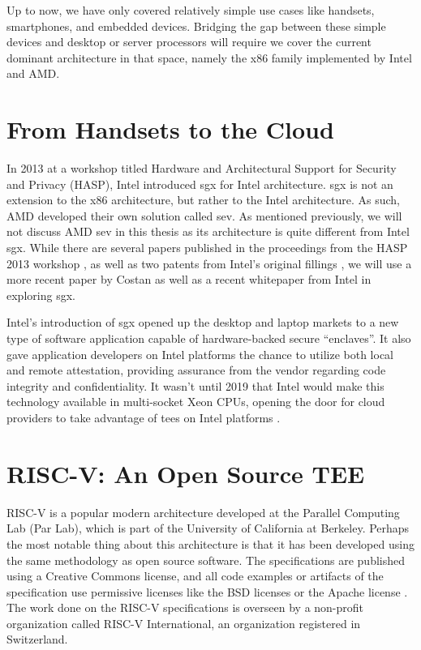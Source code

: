 Up to now, we have only covered relatively simple use cases like handsets, smartphones, and embedded devices. Bridging the gap between these simple devices and desktop or server processors will require we cover the current dominant architecture in that space, namely the x86 family implemented by Intel and AMD.

\section{From Handsets to the Cloud}
In 2013 at a workshop titled Hardware and Architectural Support for Security and Privacy (HASP), Intel introduced \gls{sgx} for Intel architecture. \gls{sgx} is not an extension to the x86 architecture, but rather to the Intel architecture. As such, AMD developed their own solution called \gls{sev}. As mentioned previously, we will not discuss AMD \gls{sev} in this thesis as its architecture is quite different from Intel \gls{sgx}. While there are several papers published in the proceedings from the HASP 2013 workshop \cite{10.1145/2487726.2488368, 10.1145/2487726.2488370, anati2013innovative}, as well as two patents from Intel's original fillings \cite{johnson2010technique, mckeen2009method}, we will use a more recent paper by Costan \cite{Costan2016} as well as a recent whitepaper from Intel \cite{johnson2016intel} in exploring \gls{sgx}.

Intel's introduction of \gls{sgx} opened up the desktop and laptop markets to a new type of software application capable of hardware-backed secure ``enclaves''. It also gave application developers on Intel platforms the chance to utilize both local and remote \gls{attestation}, providing assurance from the vendor regarding code integrity and confidentiality. It wasn't until 2019 that Intel would make this technology available in multi-socket Xeon CPUs, opening the door for cloud providers to take advantage of \glspl{tee} on Intel platforms \cite{10.1145/3337167.3337173}.

\section{RISC-V: An Open Source TEE}
RISC-V is a popular modern architecture developed at the Parallel Computing Lab (Par Lab), which is part of the University of California at Berkeley. Perhaps the most notable thing about this architecture is that it has been developed using the same methodology as open source software. The specifications are published using a Creative Commons license, and all code examples or artifacts of the specification use permissive licenses like the BSD licenses or the Apache license \cite{UnprivIsa2019}. The work done on the RISC-V specifications is overseen by a non-profit organization called RISC-V International, an organization registered in Switzerland.

